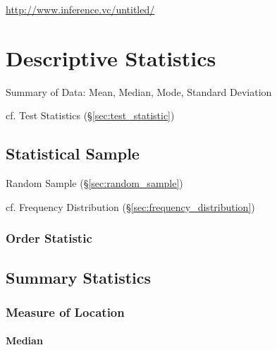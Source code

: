 \url{http://www.inference.vc/untitled/}



\section{Descriptive Statistics}\label{sec:descriptive_statistics}

Summary of Data: Mean, Median, Mode, Standard Deviation

cf. Test Statistics (\S\ref{sec:test_statistic})



\subsection{Statistical Sample}\label{sec:statistical_sample}

Random Sample (\S\ref{sec:random_sample})

\fist cf. Frequency Distribution (\S\ref{sec:frequency_distribution})



\subsubsection{Order Statistic}\label{sec:order_statistic}



\subsection{Summary Statistics}\label{sec:summary_statistics}

\subsubsection{Measure of Location}\label{sec:location_measure}

\paragraph{Median}\label{sec:median}\hfill

